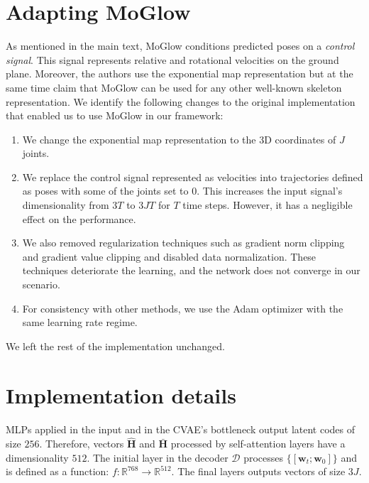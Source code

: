 \documentclass[main.tex]{subfiles}
\begin{document}
\appendix
\setcounter{page}{1}

%
\appendix

\section{Adapting MoGlow}
As mentioned in the main text, MoGlow \cite{henter2020moglow} conditions predicted poses on a \textit{control signal}. This signal represents relative and rotational velocities on the ground plane. Moreover, the authors use the exponential map representation but at the same time claim that MoGlow can be used for any other well-known skeleton representation. We identify the following changes to the original implementation that enabled us to use MoGlow in our framework:
\begin{enumerate}
    \item We change the exponential map representation to the 3D coordinates of $J$ joints.
    \item We replace the control signal represented as velocities into trajectories defined as poses with some of the joints set to 0. This increases the input signal's dimensionality from $3T$ to $3JT$ for $T$ time steps. However, it has a negligible effect on the performance.
    \item We also removed regularization techniques such as gradient norm clipping and gradient value clipping and disabled data normalization. These techniques deteriorate the learning, and the network does not converge in our scenario.
    \item For consistency with other methods, we use the Adam optimizer \cite{kingma2014adam} with the same learning rate regime.
\end{enumerate}
We left the rest of the implementation unchanged. 

\section{Implementation details}
\paragraph{\trajevae{}} MLPs applied in the input and in the CVAE's bottleneck output latent codes of size $256$. Therefore, vectors $\hat{\mathbf{H}}$ and $\bar{\mathbf{H}}$ processed by self-attention layers have a dimensionality $512$. The initial layer in the decoder $\mathcal{D}$ processes $\{[\mathbf{w}_t; \mathbf{w}_0]\}$ and is defined as a function: $f: \mathbb{R}^{768} \rightarrow \mathbb{R}^{512}$. The final layers outputs vectors of size $3J$.
\end{document}
